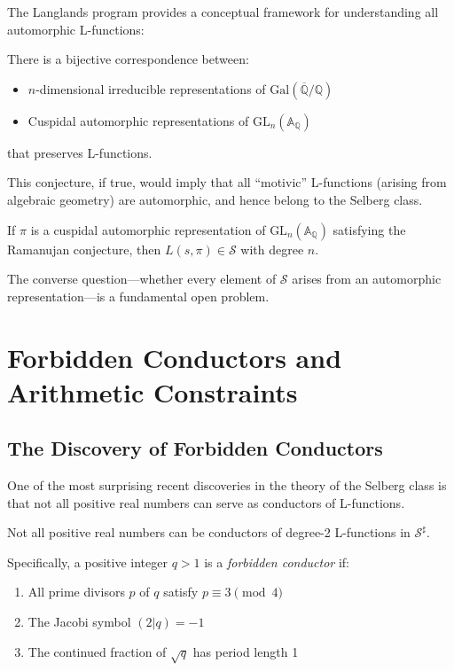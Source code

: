 The Langlands program provides a conceptual framework for understanding all automorphic L-functions:

\begin{conjecture}
There is a bijective correspondence between:
\begin{itemize}
\item $n$-dimensional irreducible representations of $\text{Gal}(\overline{\mathbb{Q}}/\mathbb{Q})$
\item Cuspidal automorphic representations of $\text{GL}_n(\mathbb{A}_\mathbb{Q})$
\end{itemize}
that preserves L-functions.
\end{conjecture}

This conjecture, if true, would imply that all ``motivic'' L-functions (arising from algebraic geometry) are automorphic, and hence belong to the Selberg class.

\begin{theorem}
If $\pi$ is a cuspidal automorphic representation of $\text{GL}_n(\mathbb{A}_\mathbb{Q})$ satisfying the Ramanujan conjecture, then $L(s,\pi) \in \mathcal{S}$ with degree $n$.
\end{theorem}

The converse question---whether every element of $\mathcal{S}$ arises from an automorphic representation---is a fundamental open problem.

\section{Forbidden Conductors and Arithmetic Constraints}
\label{sec:forbidden-conductors}

\subsection{The Discovery of Forbidden Conductors}

One of the most surprising recent discoveries in the theory of the Selberg class is that not all positive real numbers can serve as conductors of L-functions.

\begin{theorem}
Not all positive real numbers can be conductors of degree-2 L-functions in $\mathcal{S}^{\sharp}$.

Specifically, a positive integer $q > 1$ is a \emph{forbidden conductor} if:
\begin{enumerate}
\item All prime divisors $p$ of $q$ satisfy $p \equiv 3 \pmod{4}$
\item The Jacobi symbol $(2|q) = -1$
\item The continued fraction of $\sqrt{q}$ has period length 1
\end{enumerate}
\end{theorem}

